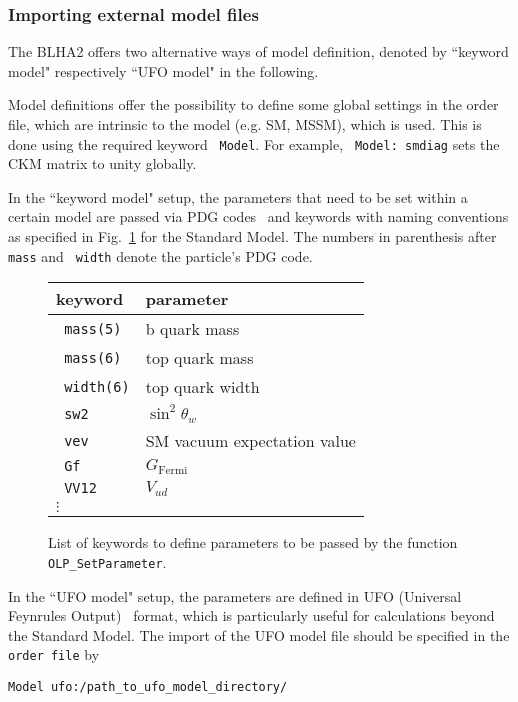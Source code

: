 \subsubsection{Importing external model files}

The BLHA2 offers two alternative ways of model definition, denoted by 
``keyword model" respectively ``UFO model" in the following.

Model definitions offer the possibility to define some global settings 
in the order file, which are intrinsic to the model (e.g. SM, MSSM), which 
is used.
This is done using the required keyword \texttt{ Model}.
For example, \texttt{ Model: smdiag} sets the CKM matrix to unity globally.

In the ``keyword model" setup, 
the parameters that need to be set within a certain model 
are passed via PDG codes~\cite{Beringer:1900zz} and keywords 
with naming
conventions as specified in Fig.~\ref{tab:keywords:static} for the Standard
Model. The numbers in parenthesis after \texttt{ mass} and \texttt{ width}  denote
the particle's PDG code.

\begin{figure}[htb]
\centering
\renewcommand{\arraystretch}{1.1}
\begin{tabular}{|l|l|}
\hline
keyword & parameter\\
\hline
\texttt{ mass(5)} & b quark mass \\
\texttt{ mass(6)} & top quark mass \\
\texttt{ width(6)} & top quark width\\
\texttt{ sw2}& $\sin^2\theta_w$\\
\texttt{ vev}& SM vacuum expectation value\\
\texttt{ Gf} & $G_{\mathrm{Fermi}}$\\
\texttt{ VV12}& $V_{ud}$\\
$\vdots$ & \\
\hline
\end{tabular}
\renewcommand{\arraystretch}{1.25}
\caption{List of keywords to define parameters to be passed by the function \texttt{
OLP\_SetParameter}.}
\label{tab:keywords:static}
\end{figure}

In the ``UFO model" setup, the parameters are defined in UFO (Universal Feynrules
Output)~\cite{Degrande:2011ua} format, which is particularly useful for
calculations beyond the Standard Model.
The import of the UFO model file should be specified in the \texttt{ order file} 
by 
\begin{lstlisting}[style=in]
      Model ufo:/path_to_ufo_model_directory/
\end{lstlisting}


